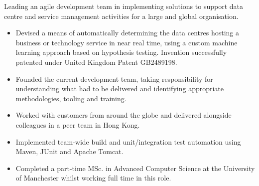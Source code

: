 \documentclass[11pt,a4paper,sans]{moderncv}        %
\begin{document}
{Leading an agile development team in implementing solutions to support data centre and service management activities for a large and global organisation.
\newline{}
\begin{itemize}
\item Devised a means of automatically determining the data centres hosting a business or technology service
in near real time, using a custom machine learning approach based on hypothesis testing.
Invention successfully patented under United Kingdom Patent GB2489198.
\item Founded the current development team,
taking responsibility for understanding what had to be delivered and
identifying appropriate methodologies, tooling and training.
\item Worked with customers from around the globe and delivered alongside colleagues in a peer team in Hong Kong.
\item Implemented team-wide build and unit/integration test automation using Maven, JUnit and Apache Tomcat.
\item Completed a part-time MSc. in Advanced Computer Science at the University of Manchester
whilst working full time in this role.
\end{itemize}
}


\end{document}
